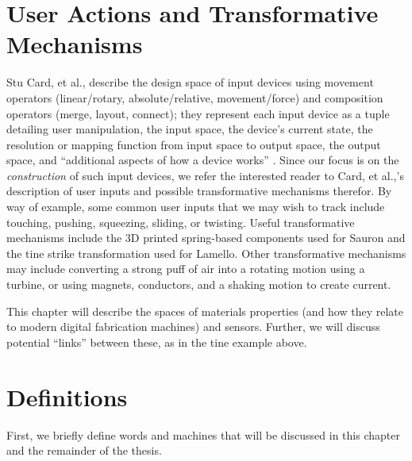 \section{User Actions and Transformative Mechanisms}

Stu Card, et al., describe the design space of input devices using movement operators (linear/rotary, absolute/relative, movement/force) and composition operators (merge, layout, connect); they represent each input device as a tuple detailing user manipulation, the input space, the device's current state, the resolution or mapping function from input space to output space, the output space, and ``additional aspects of how a device works'' \cite{card-input}. Since our focus is on the \emph{construction} of such input devices, we refer the interested reader to Card, et al.,'s description of user inputs and possible transformative mechanisms therefor. By way of example, some common user inputs that we may wish to track include touching, pushing, squeezing, sliding, or twisting. Useful transformative mechanisms include the 3D printed spring-based components used for Sauron and the tine strike transformation used for Lamello. Other transformative mechanisms may include converting a strong puff of air into a rotating motion using a turbine, or using magnets, conductors, and a shaking motion to create current.

This chapter will describe the spaces of materials properties (and how they relate to modern digital fabrication machines) and sensors. Further, we will discuss potential ``links'' between these, as in the tine example above.

\section{Definitions}

First, we briefly define words and machines that will be discussed in this chapter and the remainder of the thesis.

